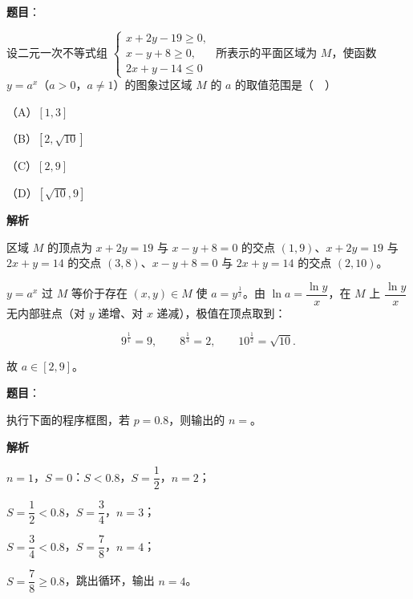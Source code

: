 \begin{answer}

\textbf{题目}：

设二元一次不等式组 $\begin{cases}x+2y-19\geqslant0,\\ x-y+8\geqslant0,\\ 2x+y-14\leqslant0\end{cases}$ 所表示的平面区域为 $M$，使函数 $y=a^x$（$a>0$，$a\neq1$）的图象过区域 $M$ 的 $a$ 的取值范围是（　）

（A）$[1,3]$

（B）$[2,\sqrt{10}]$

（C）$[2,9]$

（D）$[\sqrt{10},9]$

\textbf{解析}

区域 $M$ 的顶点为 $x+2y=19$ 与 $x-y+8=0$ 的交点 $(1,9)$、$x+2y=19$ 与 $2x+y=14$ 的交点 $(3,8)$、$x-y+8=0$ 与 $2x+y=14$ 的交点 $(2,10)$。

$y=a^x$ 过 $M$ 等价于存在 $(x,y)\in M$ 使 $a=y^{\frac1x}$。由 $\ln a=\dfrac{\ln y}x$，在 $M$ 上 $\dfrac{\ln y}x$ 无内部驻点（对 $y$ 递增、对 $x$ 递减），极值在顶点取到：

\nopagebreak[4]
\[9^{\frac11}=9,\qquad 8^{\frac13}=2,\qquad 10^{\frac12}=\sqrt{10}.\]

故 $a\in[2,9]$。


\end{answer}
\begin{answer}

\textbf{题目}：

执行下面的程序框图，若 $p=0.8$，则输出的 $n=$\gkblank{}。
\nopagebreak[4]
\begin{center}\end{center}
\nopagebreak[4]
\textbf{解析}

$n=1$，$S=0$：$S<0.8$，$S=\dfrac12$，$n=2$；

$S=\dfrac12<0.8$，$S=\dfrac34$，$n=3$；

$S=\dfrac34<0.8$，$S=\dfrac78$，$n=4$；

$S=\dfrac78\geqslant0.8$，跳出循环，输出 $n=4$。


\end{answer}
